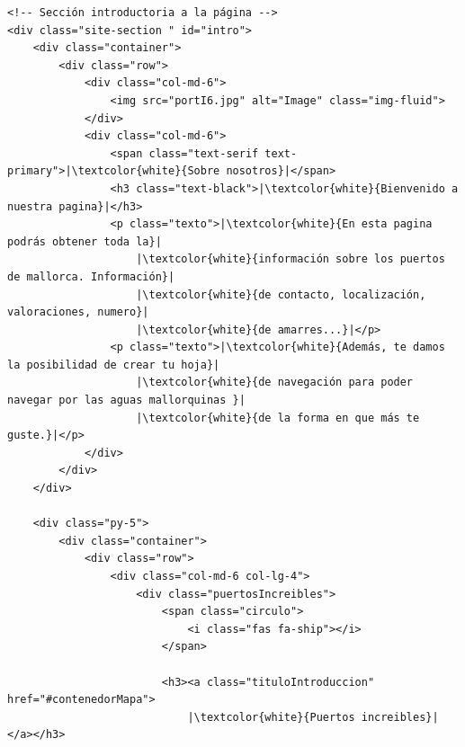 \documentclass{article}
\begin{document}
\begin{verbatim}
<!-- Sección introductoria a la página -->
<div class="site-section " id="intro">
    <div class="container">
        <div class="row">
            <div class="col-md-6">
                <img src="portI6.jpg" alt="Image" class="img-fluid">
            </div>
            <div class="col-md-6">
                <span class="text-serif text-primary">|\textcolor{white}{Sobre nosotros}|</span>
                <h3 class="text-black">|\textcolor{white}{Bienvenido a nuestra pagina}|</h3>
                <p class="texto">|\textcolor{white}{En esta pagina podrás obtener toda la}|
                    |\textcolor{white}{información sobre los puertos de mallorca. Información}| 
                    |\textcolor{white}{de contacto, localización, valoraciones, numero}|
                    |\textcolor{white}{de amarres...}|</p>
                <p class="texto">|\textcolor{white}{Además, te damos la posibilidad de crear tu hoja}| 
                    |\textcolor{white}{de navegación para poder navegar por las aguas mallorquinas }|
                    |\textcolor{white}{de la forma en que más te guste.}|</p>
            </div>
        </div>
    </div>

    <div class="py-5">
        <div class="container">
            <div class="row">
                <div class="col-md-6 col-lg-4">
                    <div class="puertosIncreibles">
                        <span class="circulo">
                            <i class="fas fa-ship"></i>
                        </span>

                        <h3><a class="tituloIntroduccion" href="#contenedorMapa">
                            |\textcolor{white}{Puertos increibles}|</a></h3>


\end{verbatim}
\end{document}
